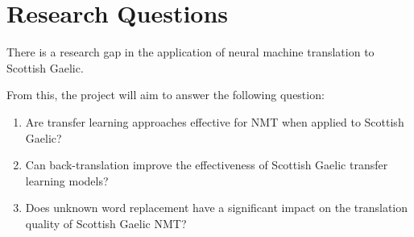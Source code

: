 
\section{Research Questions}
There is a research gap in the application of neural machine translation to Scottish Gaelic.

From this, the project will aim to answer the following question:

\begin{enumerate}
    \item Are transfer learning approaches effective for \acrshort{NMT} when applied to Scottish Gaelic?
    \item Can back-translation improve the effectiveness of Scottish Gaelic transfer learning models?
    \item Does unknown word replacement have a significant impact on the translation quality of Scottish Gaelic \acrshort{NMT}?
\end{enumerate}
